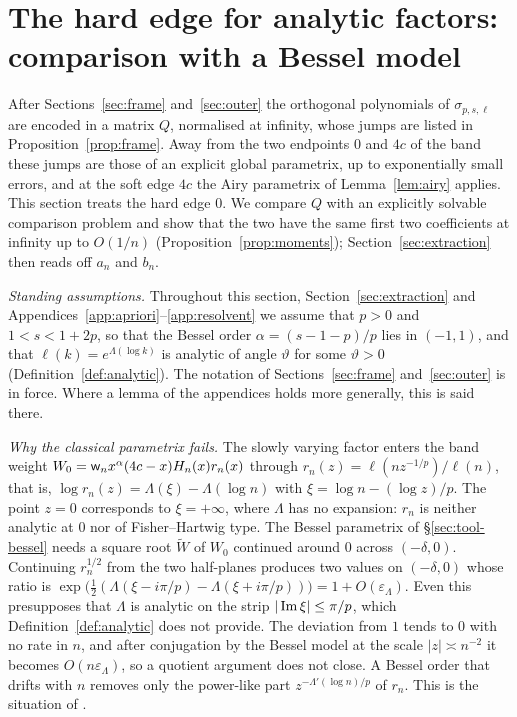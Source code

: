 
\section{The hard edge for analytic factors: comparison with a Bessel model}\label{sec:hardedge}

After Sections~\ref{sec:frame} and~\ref{sec:outer} the orthogonal polynomials of $\sigma_{p,s,\ell}$ are encoded in a
matrix $Q$, normalised at infinity, whose jumps are listed in Proposition~\ref{prop:frame}. Away from the two endpoints
$0$ and $4c$ of the band these jumps are those of an explicit global parametrix, up to exponentially small errors, and
at the soft edge $4c$ the Airy parametrix of Lemma~\ref{lem:airy} applies. This section treats the hard edge $0$. We
compare $Q$ with an explicitly solvable comparison problem and show that the two have the same first two
coefficients at infinity up to $O(1/n)$ (Proposition~\ref{prop:moments}); Section~\ref{sec:extraction} then reads off
$a_n$ and $b_n$.

\emph{Standing assumptions.} Throughout this section, Section~\ref{sec:extraction} and
Appendices~\ref{app:apriori}--\ref{app:resolvent} we assume that $p>0$ and $1<s<1+2p$, so that the Bessel order
$\alpha=(s-1-p)/p$ lies in $(-1,1)$, and that $\ell(k)=e^{\Lambda(\log k)}$ is analytic of angle $\vartheta$ for some
$\vartheta>0$ (Definition~\ref{def:analytic}). The notation of Sections~\ref{sec:frame} and~\ref{sec:outer} is in
force. Where a lemma of the appendices holds more generally, this is said there.

\emph{Why the classical parametrix fails.} The slowly varying factor enters the band weight
$W_0=\mathsf w_n x^\alpha(4c-x)H_n(x)r_n(x)$ through $r_n(z)=\ell(nz^{-1/p})/\ell(n)$, that is,
$\log r_n(z)=\Lambda(\xi)-\Lambda(\log n)$ with $\xi=\log n-(\log z)/p$. The point $z=0$ corresponds to
$\xi=+\infty$, where $\Lambda$ has no expansion: $r_n$ is neither analytic at $0$ nor of Fisher--Hartwig type. The
Bessel parametrix of \S\ref{sec:tool-bessel} needs a square root $\tilde W$ of $W_0$ continued around $0$ across
$(-\delta,0)$. Continuing $r_n^{1/2}$ from the two half-planes produces two values on $(-\delta,0)$ whose ratio is
$\exp\bigl(\frac12(\Lambda(\xi-i\pi/p)-\Lambda(\xi+i\pi/p))\bigr)=1+O(\varepsilon_\Lambda)$. Even this presupposes
that $\Lambda$ is analytic on the strip $|\operatorname{Im}\xi|\le\pi/p$, which Definition~\ref{def:analytic} does not provide.
The deviation from $1$ tends to $0$ with no rate in $n$, and after conjugation by the Bessel model at the scale
$|z|\asymp n^{-2}$ it becomes $O(n\varepsilon_\Lambda)$, so a quotient argument does not close. A Bessel order that
drifts with $n$ removes only the power-like part $z^{-\Lambda'(\log n)/p}$ of $r_n$. This is the situation of
\cite[Remark~4.10]{CD}.

